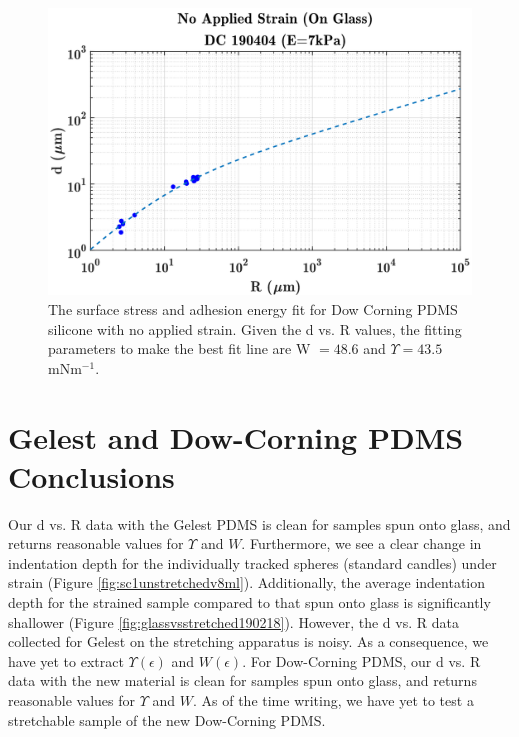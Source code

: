 \begin{figure}[h]
	\centering
	\includegraphics[width=\linewidth]{Chapters/Figures/WUps_fit_DC190404}
	\caption[Dow Corning W-$\Upsilon $ Fit]{The surface stress and adhesion energy fit for Dow Corning PDMS silicone with no applied strain. Given the d vs. R values, the fitting parameters to make the best fit line are W $ = 48.6$ and  $\Upsilon = 43.5$ mNm$^{-1}$.}
	\label{fig:wupsfitdc190404}
\end{figure}

\section{Gelest and Dow-Corning PDMS Conclusions}
Our d vs. R data with the Gelest PDMS is clean for samples spun onto glass, and returns reasonable values for $ \Upsilon $ and $ W $. Furthermore, we see a clear change in indentation depth for the individually tracked spheres (standard candles) under strain (Figure \ref{fig:sc1unstretchedv8ml}). Additionally, the average indentation depth for the strained sample compared to that spun onto glass is significantly shallower (Figure \ref{fig:glassvsstretched190218}). However, the d vs. R data collected for Gelest on the stretching apparatus is noisy. As a consequence, we have yet to extract $ \Upsilon(\epsilon) $ and $ W(\epsilon) $. For Dow-Corning PDMS, our d vs. R data with the new material is clean for samples spun onto glass, and returns reasonable values for $ \Upsilon $ and $ W $. As of the time writing, we have yet to test a stretchable sample of the new Dow-Corning PDMS.

